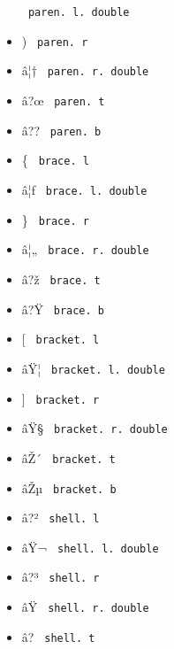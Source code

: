 \begin{itemize}
{  \texttt{\ paren.\ l.\ double\ }}
\item
  \label{symbol-paren.r}{{ ) } \texttt{\ paren.\ r\ }}
\item
  \label{symbol-paren.r.double}{{ â¦† }
  \texttt{\ paren.\ r.\ double\ }}
\item
  \label{symbol-paren.t}{{ â?œ } \texttt{\ paren.\ t\ }}
\item
  \label{symbol-paren.b}{{ â?? } \texttt{\ paren.\ b\ }}
\item
  \label{symbol-brace.l}{{ \{ } \texttt{\ brace.\ l\ }}
\item
  \label{symbol-brace.l.double}{{ â¦ƒ }
  \texttt{\ brace.\ l.\ double\ }}
\item
  \label{symbol-brace.r}{{ \} } \texttt{\ brace.\ r\ }}
\item
  \label{symbol-brace.r.double}{{ â¦„ }
  \texttt{\ brace.\ r.\ double\ }}
\item
  \label{symbol-brace.t}{{ â?ž } \texttt{\ brace.\ t\ }}
\item
  \label{symbol-brace.b}{{ â?Ÿ } \texttt{\ brace.\ b\ }}
\item
  \label{symbol-bracket.l}{{ {[} }
  \texttt{\ bracket.\ l\ }}
\item
  \label{symbol-bracket.l.double}{{ âŸ¦ }
  \texttt{\ bracket.\ l.\ double\ }}
\item
  \label{symbol-bracket.r}{{ {]} }
  \texttt{\ bracket.\ r\ }}
\item
  \label{symbol-bracket.r.double}{{ âŸ§ }
  \texttt{\ bracket.\ r.\ double\ }}
\item
  \label{symbol-bracket.t}{{ âŽ´ }
  \texttt{\ bracket.\ t\ }}
\item
  \label{symbol-bracket.b}{{ âŽµ }
  \texttt{\ bracket.\ b\ }}
\item
  \label{symbol-shell.l}{{ â?² } \texttt{\ shell.\ l\ }}
\item
  \label{symbol-shell.l.double}{{ âŸ¬ }
  \texttt{\ shell.\ l.\ double\ }}
\item
  \label{symbol-shell.r}{{ â?³ } \texttt{\ shell.\ r\ }}
\item
  \label{symbol-shell.r.double}{{ âŸ­ }
  \texttt{\ shell.\ r.\ double\ }}
\item
  \label{symbol-shell.t}{{ â? } \texttt{\ shell.\ t\ }}

\end{itemize}
